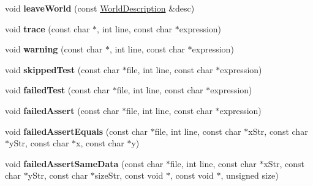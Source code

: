 \begin{DoxyCompactItemize}
\item 
\hypertarget{classCxxTest_1_1XmlFormatter_a557b89b8ea43c14d4bd479b0292fb77c}{void {\bfseries leave\-World} (const \hyperlink{classCxxTest_1_1WorldDescription}{World\-Description} \&desc)}\label{classCxxTest_1_1XmlFormatter_a557b89b8ea43c14d4bd479b0292fb77c}

\item 
\hypertarget{classCxxTest_1_1XmlFormatter_ab04914a298185efed9379cbfec0e9615}{void {\bfseries trace} (const char $\ast$, int line, const char $\ast$expression)}\label{classCxxTest_1_1XmlFormatter_ab04914a298185efed9379cbfec0e9615}

\item 
\hypertarget{classCxxTest_1_1XmlFormatter_ac7f5a5024a2339893f0ba388de3f28e5}{void {\bfseries warning} (const char $\ast$, int line, const char $\ast$expression)}\label{classCxxTest_1_1XmlFormatter_ac7f5a5024a2339893f0ba388de3f28e5}

\item 
\hypertarget{classCxxTest_1_1XmlFormatter_a01954113fd60970d7b192973f7d7808a}{void {\bfseries skipped\-Test} (const char $\ast$file, int line, const char $\ast$expression)}\label{classCxxTest_1_1XmlFormatter_a01954113fd60970d7b192973f7d7808a}

\item 
\hypertarget{classCxxTest_1_1XmlFormatter_a4b9c7b36f5bd571678558ae1646d9dc0}{void {\bfseries failed\-Test} (const char $\ast$file, int line, const char $\ast$expression)}\label{classCxxTest_1_1XmlFormatter_a4b9c7b36f5bd571678558ae1646d9dc0}

\item 
\hypertarget{classCxxTest_1_1XmlFormatter_a2b967e63e3c281317a767c66feeb5f56}{void {\bfseries failed\-Assert} (const char $\ast$file, int line, const char $\ast$expression)}\label{classCxxTest_1_1XmlFormatter_a2b967e63e3c281317a767c66feeb5f56}

\item 
\hypertarget{classCxxTest_1_1XmlFormatter_ac213f70b5a9933b74460acfe07992933}{void {\bfseries failed\-Assert\-Equals} (const char $\ast$file, int line, const char $\ast$x\-Str, const char $\ast$y\-Str, const char $\ast$x, const char $\ast$y)}\label{classCxxTest_1_1XmlFormatter_ac213f70b5a9933b74460acfe07992933}

\item 
\hypertarget{classCxxTest_1_1XmlFormatter_a7e5139dae9b76acf6705f214962242c3}{void {\bfseries failed\-Assert\-Same\-Data} (const char $\ast$file, int line, const char $\ast$x\-Str, const char $\ast$y\-Str, const char $\ast$size\-Str, const void $\ast$, const void $\ast$, unsigned size)}\label{classCxxTest_1_1XmlFormatter_a7e5139dae9b76acf6705f214962242c3}


\end{DoxyCompactItemize}
